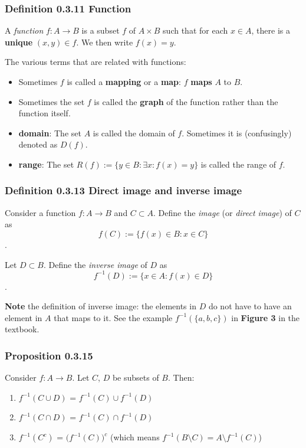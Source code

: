 \documentclass[12pt, letterpaper, oneside]{book}
\begin{document}
\subsubsection{Definition 0.3.11 Function}

A \textit{function} $f: A \rightarrow B$ is a subset $f$ of $A \times B$ such
that for each $x \in A$, there is a \textbf{unique} $(x,y) \in f$. We then
write $f(x) = y$.

The various terms that are related with functions:
\begin{itemize}
  \item Sometimes $f$ is called a \textbf{mapping} or a \textbf{map}: $f$
        \textbf{maps} $A$ to $B$.
  \item Sometimes the set $f$ is called the \textbf{graph} of the function
        rather than the function itself.
  \item \textbf{domain}: The set $A$ is called the domain of $f$. Sometimes it
        is (confusingly) denoted as $D(f)$.
  \item \textbf{range}: The set $R(f) := \{y \in B: \exists x: f(x) = y\}$ is
        called the range of $f$.
\end{itemize}

\subsubsection{Definition 0.3.13 Direct image and inverse image}

Consider a function $f: A \rightarrow B$ and $C \subset A$. Define the
\textit{image} (or \textit{direct image}) of $C$ as \[ f(C) := \{f(x) \in B:
  x \in C\} \].

Let $D \subset B$. Define the \textit{inverse image} of $D$ as \[ f^{-1}(D) :=
  \{x \in A: f(x) \in D\}\].

\textbf{Note} the definition of inverse image: the elements in $D$ do not have
to have an element in $A$ that maps to it. See the example $f^{-1}(\{a,b,c\})$
in \textbf{Figure 3} in the textbook.

\subsubsection{Proposition 0.3.15}

Consider $f: A \rightarrow B$. Let $C$, $D$ be subsets of $B$. Then:
\begin{enumerate}
  \item $f^{-1}(C \cup D)$ = $f^{-1}(C) \cup f^{-1}(D)$
  \item $f^{-1}(C \cap D)$ = $f^{-1}(C) \cap f^{-1}(D)$
  \item $f^{-1}(C^c)$ = $\bigl(f^{-1}(C)\bigr)^c$ (which means $f^{-1}(B
          \setminus C) = A \setminus f^{-1}(C)$)
\end{enumerate}
\end{document}
